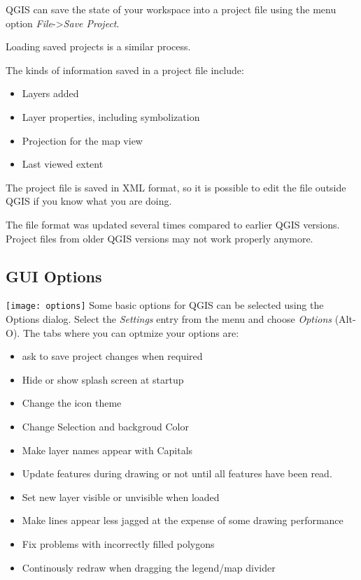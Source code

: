QGIS can save the state of your workspace into a project file using
the menu option \textit{File}->\textit{Save Project}.

Loading saved projects is a similar process.

The kinds of information saved in a project file include:

\begin{itemize}
\item Layers added
\item Layer properties, including symbolization
\item Projection for the map view
\item Last viewed extent
\end{itemize}

The project file is saved in XML format, so it is possible to edit
the file outside QGIS if you know what you are doing.  

The file format was updated several times compared to earlier QGIS versions. Project files 
from older QGIS versions may not work properly anymore.

\subsection{GUI Options}
\label{subsec:gui_options}
\texttt{[image: options]} Some basic options for QGIS
can be selected using the Options dialog. Select the \textsl{Settings} entry
from the menu and choose \textsl{Options} (Alt-O). The tabs where you can 
optmize your options are:


\begin{itemize}
\item ask to save project changes when required
\end{itemize}


\begin{itemize}
\item Hide or show splash screen at startup
\item Change the icon theme 
\item Change Selection and backgroud Color
\item Make layer names appear with Capitals
\end{itemize}


\begin{itemize}
\item Update features during drawing or not until all features have been read.
\item Set new layer visible or unvisible when loaded 
\item Make lines appear less jagged at the expense of some drawing performance
\item Fix problems with incorrectly filled polygons
\item Continously redraw when dragging the legend/map divider 
\end{itemize}

